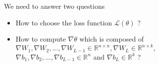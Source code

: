 \savestack{\nnfruitclassexample}{}
\savestack{\nnimdbexample}{}
\savestack{\nn}{}


\begin{frame}
\end{frame}

\begin{frame}
  \begin{block}{We need to answer two questions}
    \begin{itemize}
      \justifying
      \item \alert<2>{How to choose the loss function $\mathscr{L}(\theta)$ ?} \color{black}
      \item How to compute $\nabla \theta$ which is composed of $\nabla W_1, \nabla W_2, ..., \nabla W_{L-1} \in \mathbb{R}^{n \times n}, \nabla W_L \in \mathbb{R}^{n \times k},$ \\ $\nabla b_1, \nabla b_2, ..., \nabla b_{L-1} \in \mathbb{R}^n $ and $\nabla b_L \in \mathbb{R}^k$ ?
    \end{itemize}
  \end{block}
\end{frame}

